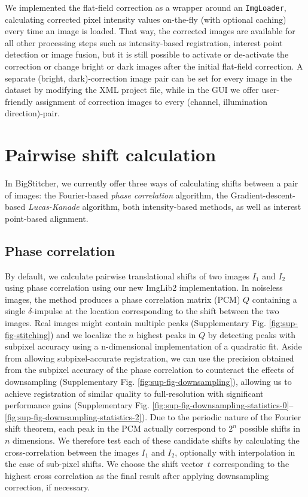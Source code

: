 We implemented the flat-field correction as a wrapper around an \texttt{ImgLoader}, calculating corrected pixel intensity values on-the-fly (with optional caching) every time an image is loaded. That way, the corrected images are available for all other processing steps such as intensity-based registration, interest point detection or image fusion, but it is still possible to activate or de-activate the correction or change bright or dark images after the initial flat-field correction. A separate (bright, dark)-correction image pair can be set for every image in the dataset by modifying the XML project file, while in the GUI we offer user-friendly assignment of correction images to every (channel, illumination direction)-pair.

\section{Pairwise shift calculation}

In BigStitcher, we currently offer three ways of calculating shifts between a pair of images: the Fourier-based \emph{phase correlation} algorithm, the Gradient-descent-based \emph{Lucas-Kanade} algorithm, both intensity-based methods, as well as interest point-based alignment.

\subsection*{Phase correlation}

By default, we calculate pairwise translational shifts of two images $I_1$ and $I_2$ using phase correlation \cite{preibisch2009globally, kuglin1975phase} using our new ImgLib2 implementation\cite{imglib2}. In noiseless images, the method produces a phase correlation matrix (PCM) $Q$ containing a single $\delta$-impulse at the location corresponding to the shift between the two images. Real images might contain multiple peaks (Supplementary Fig. \ref{fig:sup-fig-stitching}) and we localize the $n$ highest peaks in $Q$ by detecting peaks with subpixel accuracy using a n-dimensional implementation of a quadratic fit\cite{lowe2004distinctive}. Aside from allowing subpixel-accurate registration, we can use the precision obtained from the subpixel accuracy of the phase correlation to counteract the effects of downsampling (Supplementary Fig. \ref{fig:sup-fig-downsampling}), allowing us to achieve registration of similar quality to full-resolution with significant performance gains (Supplementary Fig. \ref{fig:sup-fig-downsampling-statistics-0}--\ref{fig:sup-fig-downsampling-statistics-2}). Due to the periodic nature of the Fourier shift theorem, each peak in the PCM actually correspond to $2^n$ possible shifts in $n$ dimensions. We therefore test each of these candidate shifts by calculating the cross-correlation between the images $I_1$ and $I_2$, optionally with interpolation in the case of sub-pixel shifts\cite{lowe2004distinctive}. We choose the shift vector~$t$ corresponding to the highest cross correlation as the final result after applying downsampling correction, if necessary.

